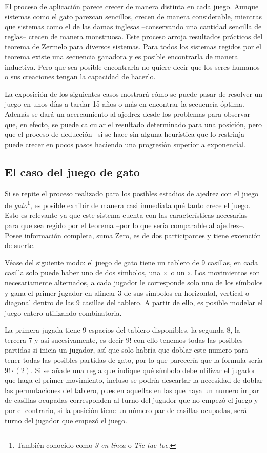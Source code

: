 \documentclass[twoside,openright,12pt,a4paper,spanish]{book}
\begin{document}
El proceso de aplicaci\'on parece crecer de manera distinta en cada juego. Aunque sistemas como el gato parezcan sencillos, crecen de manera considerable, mientras que sistemas como el de las damas inglesas --conservando una cantidad sencilla de reglas-- crecen de manera monstruosa. Este proceso arroja resultados pr\'acticos del teorema de Zermelo para diversos sistemas. Para todos los sistemas regidos por el teorema existe una secuencia ganadora y es posible encontrarla de manera inductiva. Pero que sea posible encontrarla no quiere decir que los seres humanos o sus creaciones tengan la capacidad de hacerlo. 

La exposición de los siguientes casos mostrará cómo se puede pasar de resolver un juego en unos d\'ias a tardar 15 años o más en encontrar la secuencia \'optima. Además se dará un acercamiento al ajedrez desde los problemas para observar que, en efecto, se puede calcular el resultado determinado para una posición, pero que el proceso de deducción --si se hace sin alguna heurística que lo restrinja-- puede crecer en pocos pasos haciendo una progresión superior a exponencial.


\subsection{El caso del juego de gato}

\noindent Si se repite el proceso realizado para los posibles estadios de ajedrez con el juego de \emph{gato}\footnote{También conocido como \emph{3 en línea} o \emph{Tic tac toe}.}, es posible exhibir de manera casi inmediata qué tanto crece el juego. Esto es relevante ya que este sistema cuenta con las caracter\'isticas necesarias para que sea regido por el teorema --por lo que sería comparable al ajedrez--. Posee informaci\'on completa, suma Zero, es de dos participantes y tiene excenci\'on de suerte.

Véase del siguiente modo: el juego de gato tiene un tablero de 9 casillas, en cada casilla solo puede haber uno de dos símbolos, una $\times$ o un $\circ$. Los movimientos son necesariamente alternados, a cada jugador le corresponde solo uno de los símbolos y gana el primer jugador en alinear 3 de sus símbolos en horizontal, vertical o diagonal dentro de las 9 casillas del tablero. A partir de ello, es posible modelar el juego entero utilizando combinatoria.

La primera jugada tiene 9 espacios del tablero disponibles, la segunda 8, la tercera 7 y as\'i sucesivamente, es decir $9!$ con ello tenemos todas las posibles partidas si inicia un jugador, as\'i que solo habr\'ia que doblar este numero para tener todas las posibles partidas de gato, por lo que parecería que la formula sería $9!\cdot(2)$. Si se añade una regla que indique qué símbolo debe utilizar el jugador que haga el primer movimiento, incluso se podría descartar la necesidad de doblar las permutaciones del tablero, pues en aquellas en las que haya un numero impar de casillas ocupadas corresponden al turno del jugador que no empezó el juego y por el contrario, si la posición tiene un número par de casillas ocupadas, será turno del jugador que empezó el juego.
\end{document}
